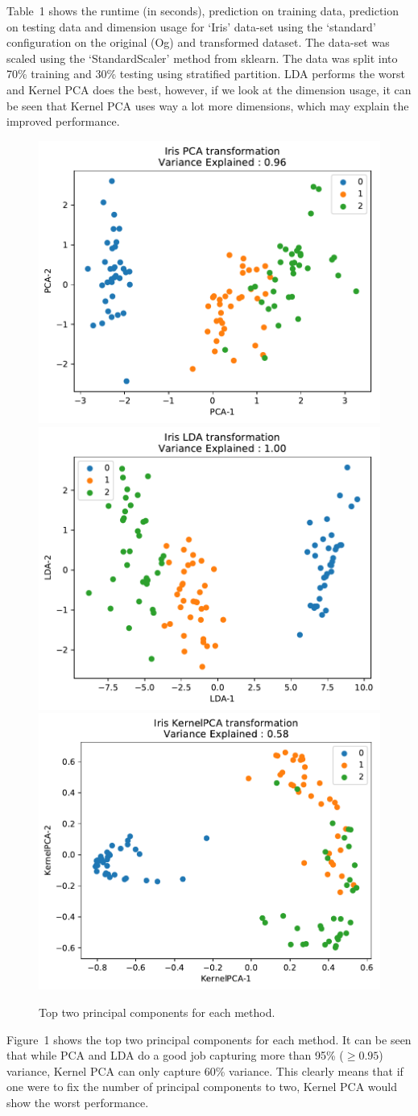 \documentclass[12pt]{article}
\begin{document}
Table~1 shows the runtime (in seconds), prediction on training data, prediction on testing data and dimension usage for `Iris' data-set using the `standard' configuration on the original (Og) and transformed dataset. The data-set was scaled using the `StandardScaler' method from sklearn. The data was split into 70\% training and 30\% testing using stratified partition.  LDA performs the worst and Kernel PCA does the best, however, if we look at the dimension usage, it can be seen that Kernel PCA uses way a lot more dimensions, which may explain the improved performance.

\begin{figure}
\begin{minipage}{\linewidth}
\includegraphics[width=0.32\linewidth]{Iris_PCA_top_two_components_.pdf}
\includegraphics[width=0.32\linewidth]{Iris_LDA_top_two_components_.pdf}
\includegraphics[width=0.32\linewidth]{Iris_KernelPCA_top_two_components_.pdf}
\end{minipage}
\caption{Top two principal components for each method.}
\end{figure}

Figure~1 shows the top two principal components for each method. It can be seen that while PCA and LDA do a good job capturing more than 95\% ($\geq 0.95$) variance, Kernel PCA can only capture 60\% variance. This clearly means that if one were to fix the number of principal components to two, Kernel PCA would show the worst performance.
\end{document}
